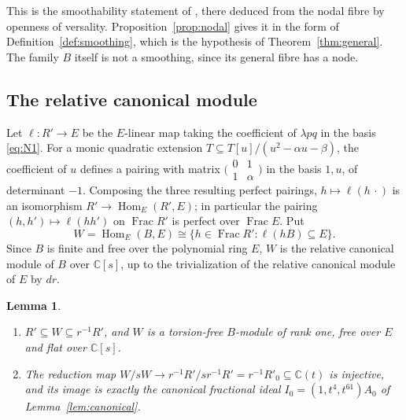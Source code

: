 \documentclass{amsart}
\newtheorem{lemma}[theorem]{Lemma}
\theoremstyle{definition}
\theoremstyle{remark}
\numberwithin{equation}{section}
\newcommand{\C}{\mathbb{C}}
\DeclareMathOperator{\Hom}{Hom}
\DeclareMathOperator{\Frac}{Frac}
\begin{document}
This is the smoothability statement of \cite[Example~2.13]{Ste}, there deduced from the nodal fibre by openness of versality. Proposition~\ref{prop:nodal} gives it in the form of Definition~\ref{def:smoothing}, which is the hypothesis of Theorem~\ref{thm:general}. The family $B$ itself is not a smoothing, since its general fibre has a node.

\subsection{The relative canonical module}
Let $\ell\colon R'\to E$ be the $E$-linear map taking the coefficient of $\lambda pq$ in the basis \eqref{eq:N1}. For a monic quadratic extension $T\subseteq T[u]/(u^2-\alpha u-\beta)$, the coefficient of $u$ defines a pairing with matrix $\bigl(\begin{smallmatrix}0&1\\1&\alpha\end{smallmatrix}\bigr)$ in the basis $1,u$, of determinant $-1$. Composing the three resulting perfect pairings, $h\mapsto\ell(h\,\cdot)$ is an isomorphism $R'\to\Hom_E(R',E)$; in particular the pairing $(h,h')\mapsto\ell(hh')$ on $\Frac R'$ is perfect over $\Frac E$. Put
\[
W=\Hom_E(B,E)\cong\{h\in\Frac R':\ell(hB)\subseteq E\}.
\]
Since $B$ is finite and free over the polynomial ring $E$, $W$ is the relative canonical module of $B$ over $\C[s]$, up to the trivialization of the relative canonical module of $E$ by $dr$.

\begin{lemma}\label{lem:W}
\begin{enumerate}
\item $R'\subseteq W\subseteq r^{-1}R'$, and $W$ is a torsion-free $B$-module of rank one, free over $E$ and flat over $\C[s]$.
\item The reduction map $W/sW\to r^{-1}R'/sr^{-1}R'=r^{-1}R'_0\subseteq\C(t)$ is injective, and its image is exactly the canonical fractional ideal $I_0=(1,t^4,t^{61})A_0$ of Lemma~\ref{lem:canonical}.
\end{enumerate}
\end{lemma}
\end{document}
